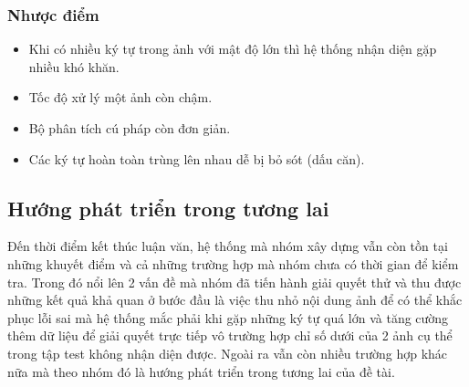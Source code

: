 \documentclass[a4paper,12pt]{article}
\begin{document}
	\subsubsection{Nhược điểm}
	
	\begin{itemize}
		\item Khi có nhiều ký tự trong ảnh với mật độ lớn thì hệ thống nhận diện gặp nhiều khó khăn.
		\item Tốc độ xử lý một ảnh còn chậm.
		\item Bộ phân tích cú pháp còn đơn giản.
		\item Các ký tự hoàn toàn trùng lên nhau dễ bị bỏ sót (dấu căn).
	\end{itemize}
	\subsection{Hướng phát triển trong tương lai}
	Đến thời điểm kết thúc luận văn, hệ thống mà nhóm xây dựng vẫn còn tồn tại những khuyết điểm và cả những trường hợp mà nhóm chưa có thời gian để kiểm tra. Trong đó nổi lên 2 vấn đề mà nhóm đã tiến hành giải quyết thử và thu được những kết quả khả quan ở bước đầu là việc thu nhỏ nội dung ảnh để có thể khắc phục lỗi sai mà hệ thống mắc phải khi gặp những ký tự quá lớn và tăng cường thêm dữ liệu để giải quyết trực tiếp vô trường hợp chỉ số dưới của 2 ảnh cụ thể trong tập test không nhận diện được. Ngoài ra vẫn còn nhiều trường hợp khác nữa mà theo nhóm đó là hướng phát triển trong tương lai của đề tài. 
	
\end{document}
